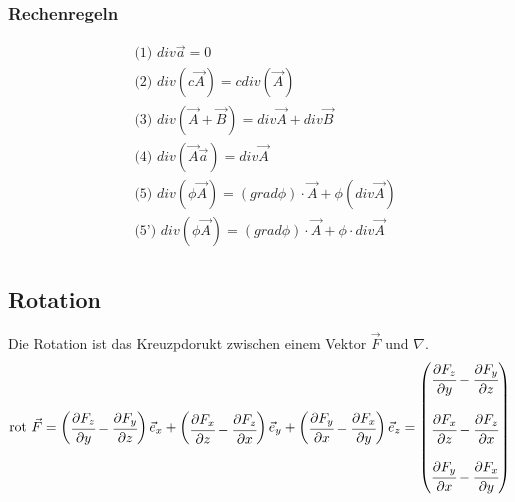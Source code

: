 \documentclass[a4paper,10pt]{scrartcl}
\begin{document}
        \subsubsection*{Rechenregeln}
        \begin{equation*}
            \begin{aligned}
                & \text{(1) } div \vec{a} = 0 \\
                & \text{(2) } div (c \vec{A}) = c div(\vec{A}) \\
                & \text{(3) } div (\vec{A} + \vec{B}) = div \vec{A} + div \vec{B} \\
                & \text{(4) } div (\vec{A} \vec{a}) = div \vec{A} \\
                & \text{(5) } div (\phi \vec{A})= (grad \phi) \cdot \vec{A} + \phi(div \vec{A}) \\
                & \text{(5') } div (\phi \vec{A})= (grad \phi) \cdot \vec{A} + \phi \cdot div \vec{A} \\
            \end{aligned}
        \end{equation*}

        \subsection{Rotation}
        Die Rotation ist das Kreuzpdorukt zwischen einem Vektor \(\vec{F}\) und \(\nabla\). 
        \begin{equation*}
            \text{rot } \vec{F} = \begin{pmatrix}
                \cfrac{\partial F_z}{\partial y}  - \cfrac{ \partial F_y}{\partial z}
            \end{pmatrix} \vec{e}_x + 
            \begin{pmatrix}
                \cfrac{\partial F_x}{\partial z}  - \cfrac{ \partial F_z}{\partial x}
            \end{pmatrix} \vec{e}_y +
            \begin{pmatrix}
                \cfrac{\partial F_y}{\partial x}  - \cfrac{ \partial F_x}{\partial y}
            \end{pmatrix} \vec{e}_z =            
            \begin{pmatrix}
                \cfrac{\partial F_z}{\partial y}  - \cfrac{ \partial F_y}{\partial z} \\
                \\
                \cfrac{\partial F_x}{\partial z}  - \cfrac{ \partial F_z}{\partial x} \\ \\
                \cfrac{\partial F_y}{\partial x}  - \cfrac{ \partial F_x}{\partial y}
            \end{pmatrix}
        \end{equation*}
\end{document}
